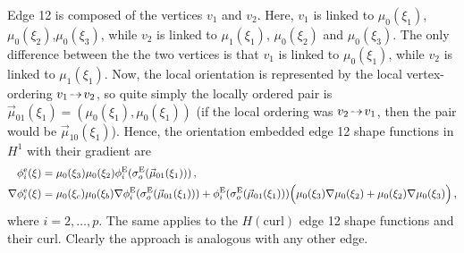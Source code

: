 Edge 12 is composed of the vertices $v_1$ and $v_2$. 
Here, $v_1$ is linked to $\mu_0(\xi_1)$, $\mu_0(\xi_2)$,$\mu_0(\xi_3)$, while $v_2$ is linked to $\mu_1(\xi_1)$, $\mu_0(\xi_2)$ and $\mu_0(\xi_3)$.
The only difference between the the two vertices is that $v_1$ is linked to $\mu_0(\xi_1)$, while $v_2$ is linked to $\mu_1(\xi_1)$.
Now, the local orientation is represented by the local vertex-ordering $v_1\tdashto v_2$, so quite simply the locally ordered pair is $\vec{\mu}_{01}(\xi_1)=(\mu_0(\xi_1),\mu_0(\xi_1))$ (if the local ordering was $v_2\tdashto v_1$, then the pair would be $\vec{\mu}_{10}(\xi_1)$).
Hence, the orientation embedded edge 12 shape functions in $H^1$ with their gradient are
\begin{equation*}
	\begin{aligned}
		\phi_i^\mathrm{e}(\xi)&=\mu_0(\xi_3)\mu_0(\xi_2)\phi_i^{\mathrm{E}}(\sigma_o^{\mathrm{E}}(\vec{\mu}_{01}(\xi_1)))\,,\\
		\nabla\phi_i^\mathrm{e}(\xi)&=\mu_0(\xi_c)\mu_0(\xi_b)\nabla\phi_i^{\mathrm{E}}(\sigma_o^{\mathrm{E}}(\vec{\mu}_{01}(\xi_1)))
			+\phi_i^{\mathrm{E}}(\sigma_o^{\mathrm{E}}(\vec{\mu}_{01}(\xi_1)))\Big(\mu_0(\xi_3)\nabla\mu_0(\xi_2)+\mu_0(\xi_2)\nabla\mu_0(\xi_3)\Big)\,,
	\end{aligned}
\end{equation*}
where $i=2,\ldots,p$. 
The same applies to the $H(\mathrm{curl})$ edge 12 shape functions and their curl.
Clearly the approach is analogous with any other edge.

